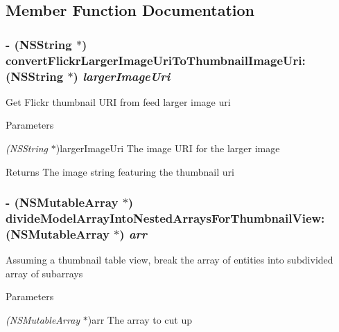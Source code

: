 \subsection{Member Function Documentation}
\hypertarget{interface_p_b_data_provider_aa5a04b738e7467fb33e515fe70e8377f}{
\subsubsection[{convertFlickrLargerImageUriToThumbnailImageUri:}]{\setlength{\rightskip}{0pt plus 5cm}-\/ ({\bf NSString} $\ast$) convertFlickrLargerImageUriToThumbnailImageUri: ({\bf NSString} $\ast$) {\em largerImageUri}}}
\label{interface_p_b_data_provider_aa5a04b738e7467fb33e515fe70e8377f}
Get Flickr thumbnail URI from feed larger image uri 
\begin{DoxyParams}{Parameters}
\item[{\em (NSString}]$\ast$)largerImageUri The image URI for the larger image \end{DoxyParams}
\begin{DoxyReturn}{Returns}
The image string featuring the thumbnail uri 
\end{DoxyReturn}
\hypertarget{interface_p_b_data_provider_a129757ab9da93b336fd706ada8ce639d}{
\subsubsection[{divideModelArrayIntoNestedArraysForThumbnailView:}]{\setlength{\rightskip}{0pt plus 5cm}-\/ (NSMutableArray $\ast$) divideModelArrayIntoNestedArraysForThumbnailView: (NSMutableArray $\ast$) {\em arr}}}
\label{interface_p_b_data_provider_a129757ab9da93b336fd706ada8ce639d}
Assuming a thumbnail table view, break the array of entities into subdivided array of subarrays 
\begin{DoxyParams}{Parameters}
\item[{\em (NSMutableArray}]$\ast$)arr The array to cut up \end{DoxyParams}
